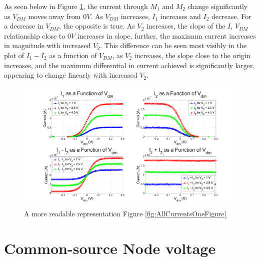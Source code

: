 \documentclass{article}
\begin{document}
As seen below in Figure \ref{fig:AllCurrentsSubplot}, the current through $M_1$ and $M_2$ change significantly as $V_{DM}$ moves away from $0V$. As $V_{DM}$ increases, $I_1$ increases and $I_2$ decrease. For a decrease in $V_{DM}$, the opposite is true. 
As $V_2$ increases, the slope of the $I$, $V_{DM}$ relationship close to $0V$ increases in slope, further, the maximum current increases in magnitude with increased $V_2$. This difference can be seen most visibly in the plot of $I_1 -I_2$ as a function of $V_{DM}$, as $V_2$ increases, the slope close to the origin increases, and the maximum differential in current achieved is significantly larger, appearing to change linearly with increased $V_2$.






\begin{figure}[H]
\centering
\includegraphics[width=\linewidth]{./Figures/AllCurrentsSubplot}
\caption{A more readable representation Figure \ref{fig:AllCurrentsOneFigure}}
\label{fig:AllCurrentsSubplot}
\end{figure}

\section*{Common-source Node voltage}
\end{document}
